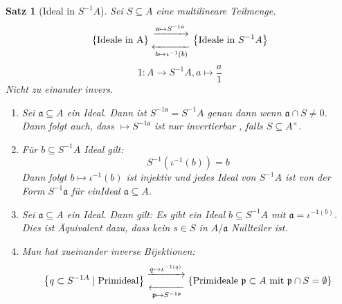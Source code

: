 \documentclass[10pt,a4paper]{article}
\newcounter{thm}[section]
\theoremstyle{definition}
\theoremstyle{plain}
\newtheorem{satz}[thm]{Satz}
\theoremstyle{remark}
\begin{document}
\begin{satz}[Ideal in $S^{-1}A$]
	Sei $S\subseteq A$ eine multilineare Teilmenge.
	\begin{align*}
	\left\{\text{Ideale in A}\right\}
	{\xrightarrow{\mathfrak a\mapsto S^{-1\mathfrak a}}\atop \xleftarrow[b\mapsto \iota^{-1}(b)]{}
	}\left\{\text{Ideale in $S^{-1}A$}\right\}
	\end{align*}
	\[1:A\rightarrow S^{-1}A,a\mapsto \frac{a}{1}\]
	Nicht zu einander invers.
	\begin{enumerate}
		\item Sei $\mathfrak a\subseteq A$ ein Ideal. Dann ist $S^{-1\mathfrak a}=S^{-1}A$ genau dann wenn $\mathfrak a\cap S\neq 0$.\\
		Dann folgt auch, dass $\mathfrak\mapsto S^{-1\mathfrak a}$ ist nur invertierbar , falls $S\subseteq A^\times$.
		\item Für $b\subseteq S^{-1}A$ Ideal gilt:\\
		\[S^{-1}(\iota^{-1}(b))=b\]
		Dann folgt $b\mapsto\iota^{-1}(b)$ ist injektiv und jedes Ideal von $S^{-1}A$ ist von der Form $S^{-1}\mathfrak a$ für einIdeal $\mathfrak a\subseteq A$.
		\item Sei $\mathfrak a\subseteq A$ ein Ideal. Dann gilt:
		Es gibt ein Ideal $b\subseteq S^{-1}A$ mit $\mathfrak a=\iota^{-1(b)}$.\\
		Dies ist Äquivalent dazu, dass kein $s\in S$ in $A/\mathfrak a$ Nullteiler ist.
		\item Man hat zueinander inverse Bijektionen: \label{4104}
		\[\left\{q\subset S^{-1 A}\mid \text{Primideal}\right\}
		{\xrightarrow{q\mapsto\iota^{-1(q)}}\atop\xleftarrow[\mathfrak p\mapsto S^{-1\mathfrak p}]{}}\left\{\text{Primideale $\mathfrak p\subset A$ mit $\mathfrak p\cap S=\emptyset$}\right\}
		\]
	\end{enumerate}
\end{satz}
\end{document}
